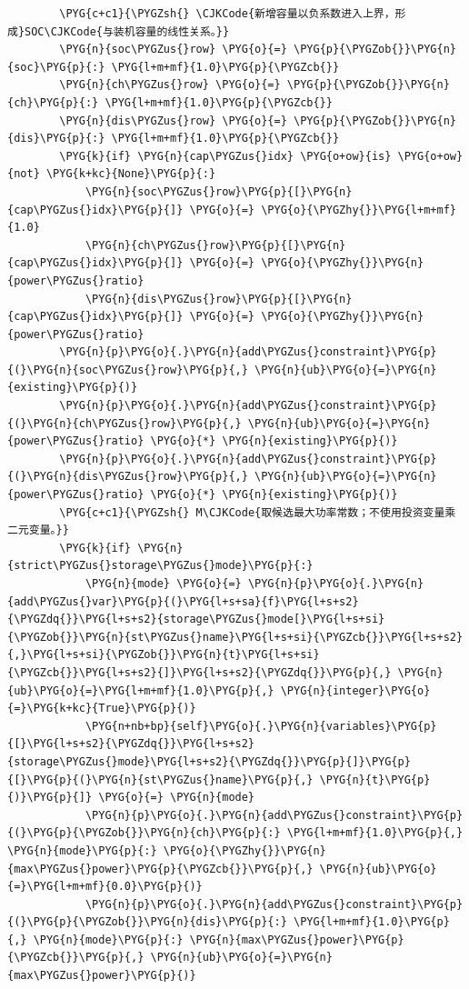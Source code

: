 \begin{Verbatim}
        \PYG{c+c1}{\PYGZsh{} \CJKCode{新增容量以负系数进入上界，形成}SOC\CJKCode{与装机容量的线性关系。}}
        \PYG{n}{soc\PYGZus{}row} \PYG{o}{=} \PYG{p}{\PYGZob{}}\PYG{n}{soc}\PYG{p}{:} \PYG{l+m+mf}{1.0}\PYG{p}{\PYGZcb{}}
        \PYG{n}{ch\PYGZus{}row} \PYG{o}{=} \PYG{p}{\PYGZob{}}\PYG{n}{ch}\PYG{p}{:} \PYG{l+m+mf}{1.0}\PYG{p}{\PYGZcb{}}
        \PYG{n}{dis\PYGZus{}row} \PYG{o}{=} \PYG{p}{\PYGZob{}}\PYG{n}{dis}\PYG{p}{:} \PYG{l+m+mf}{1.0}\PYG{p}{\PYGZcb{}}
        \PYG{k}{if} \PYG{n}{cap\PYGZus{}idx} \PYG{o+ow}{is} \PYG{o+ow}{not} \PYG{k+kc}{None}\PYG{p}{:}
            \PYG{n}{soc\PYGZus{}row}\PYG{p}{[}\PYG{n}{cap\PYGZus{}idx}\PYG{p}{]} \PYG{o}{=} \PYG{o}{\PYGZhy{}}\PYG{l+m+mf}{1.0}
            \PYG{n}{ch\PYGZus{}row}\PYG{p}{[}\PYG{n}{cap\PYGZus{}idx}\PYG{p}{]} \PYG{o}{=} \PYG{o}{\PYGZhy{}}\PYG{n}{power\PYGZus{}ratio}
            \PYG{n}{dis\PYGZus{}row}\PYG{p}{[}\PYG{n}{cap\PYGZus{}idx}\PYG{p}{]} \PYG{o}{=} \PYG{o}{\PYGZhy{}}\PYG{n}{power\PYGZus{}ratio}
        \PYG{n}{p}\PYG{o}{.}\PYG{n}{add\PYGZus{}constraint}\PYG{p}{(}\PYG{n}{soc\PYGZus{}row}\PYG{p}{,} \PYG{n}{ub}\PYG{o}{=}\PYG{n}{existing}\PYG{p}{)}
        \PYG{n}{p}\PYG{o}{.}\PYG{n}{add\PYGZus{}constraint}\PYG{p}{(}\PYG{n}{ch\PYGZus{}row}\PYG{p}{,} \PYG{n}{ub}\PYG{o}{=}\PYG{n}{power\PYGZus{}ratio} \PYG{o}{*} \PYG{n}{existing}\PYG{p}{)}
        \PYG{n}{p}\PYG{o}{.}\PYG{n}{add\PYGZus{}constraint}\PYG{p}{(}\PYG{n}{dis\PYGZus{}row}\PYG{p}{,} \PYG{n}{ub}\PYG{o}{=}\PYG{n}{power\PYGZus{}ratio} \PYG{o}{*} \PYG{n}{existing}\PYG{p}{)}
        \PYG{c+c1}{\PYGZsh{} M\CJKCode{取候选最大功率常数；不使用投资变量乘二元变量。}}
        \PYG{k}{if} \PYG{n}{strict\PYGZus{}storage\PYGZus{}mode}\PYG{p}{:}
            \PYG{n}{mode} \PYG{o}{=} \PYG{n}{p}\PYG{o}{.}\PYG{n}{add\PYGZus{}var}\PYG{p}{(}\PYG{l+s+sa}{f}\PYG{l+s+s2}{\PYGZdq{}}\PYG{l+s+s2}{storage\PYGZus{}mode[}\PYG{l+s+si}{\PYGZob{}}\PYG{n}{st\PYGZus{}name}\PYG{l+s+si}{\PYGZcb{}}\PYG{l+s+s2}{,}\PYG{l+s+si}{\PYGZob{}}\PYG{n}{t}\PYG{l+s+si}{\PYGZcb{}}\PYG{l+s+s2}{]}\PYG{l+s+s2}{\PYGZdq{}}\PYG{p}{,} \PYG{n}{ub}\PYG{o}{=}\PYG{l+m+mf}{1.0}\PYG{p}{,} \PYG{n}{integer}\PYG{o}{=}\PYG{k+kc}{True}\PYG{p}{)}
            \PYG{n+nb+bp}{self}\PYG{o}{.}\PYG{n}{variables}\PYG{p}{[}\PYG{l+s+s2}{\PYGZdq{}}\PYG{l+s+s2}{storage\PYGZus{}mode}\PYG{l+s+s2}{\PYGZdq{}}\PYG{p}{]}\PYG{p}{[}\PYG{p}{(}\PYG{n}{st\PYGZus{}name}\PYG{p}{,} \PYG{n}{t}\PYG{p}{)}\PYG{p}{]} \PYG{o}{=} \PYG{n}{mode}
            \PYG{n}{p}\PYG{o}{.}\PYG{n}{add\PYGZus{}constraint}\PYG{p}{(}\PYG{p}{\PYGZob{}}\PYG{n}{ch}\PYG{p}{:} \PYG{l+m+mf}{1.0}\PYG{p}{,} \PYG{n}{mode}\PYG{p}{:} \PYG{o}{\PYGZhy{}}\PYG{n}{max\PYGZus{}power}\PYG{p}{\PYGZcb{}}\PYG{p}{,} \PYG{n}{ub}\PYG{o}{=}\PYG{l+m+mf}{0.0}\PYG{p}{)}
            \PYG{n}{p}\PYG{o}{.}\PYG{n}{add\PYGZus{}constraint}\PYG{p}{(}\PYG{p}{\PYGZob{}}\PYG{n}{dis}\PYG{p}{:} \PYG{l+m+mf}{1.0}\PYG{p}{,} \PYG{n}{mode}\PYG{p}{:} \PYG{n}{max\PYGZus{}power}\PYG{p}{\PYGZcb{}}\PYG{p}{,} \PYG{n}{ub}\PYG{o}{=}\PYG{n}{max\PYGZus{}power}\PYG{p}{)}


\end{Verbatim}
